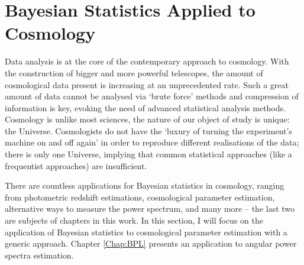 
\section{Bayesian Statistics Applied to Cosmology}\label{sec:intro:motivation}
Data analysis is at the core of the contemporary approach to cosmology. With the construction of bigger and more powerful telescopes, the amount of cosmological data present is increasing at an unprecedented rate. Such a great amount of data cannot be analysed via `brute force' methods and compression of information is key, evoking the need of advanced statistical analysis methods. Cosmology is unlike most sciences, the nature of our object of study is unique: the Universe. Cosmologists do not have the `luxury of turning the experiment's machine on and off again' in order to reproduce different realisations of the data; there is only one Universe, implying that common statistical approaches (like a frequentist approaches) are insufficient.

\qquad There are countless applications for Bayesian statistics in cosmology, ranging from photometric redshift estimations, cosmological parameter estimation, alternative ways to measure the power spectrum, and many more -- the last two are subjects of chapters in this work. In this section, I will focus on the application of Bayesian statistics to cosmological parameter estimation with a generic approach. Chapter \ref{Chap:BPL} presents an application to angular power spectra estimation.


